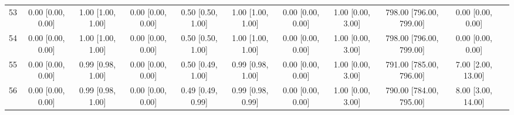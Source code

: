 \documentclass[8pt]{article}
\begin{document}
\begin{center}
\begin{footnotesize}
\begin{longtable}{|ccccccccccc|}
 53 &  0.00 [0.00, 0.00] &  1.00 [1.00, 1.00] &  0.00 [0.00, 0.00] &  0.50 [0.50, 1.00] &  1.00 [1.00, 1.00] &  0.00 [0.00, 0.00] &  1.00 [0.00, 3.00] &  798.00 [796.00, 799.00] &       0.00 [0.00, 0.00] \\
 54 &  0.00 [0.00, 0.00] &  1.00 [1.00, 1.00] &  0.00 [0.00, 0.00] &  0.50 [0.50, 1.00] &  1.00 [1.00, 1.00] &  0.00 [0.00, 0.00] &  1.00 [0.00, 3.00] &  798.00 [796.00, 799.00] &       0.00 [0.00, 0.00] \\
 55 &  0.00 [0.00, 0.00] &  0.99 [0.98, 1.00] &  0.00 [0.00, 0.00] &  0.50 [0.49, 1.00] &  0.99 [0.98, 1.00] &  0.00 [0.00, 0.00] &  1.00 [0.00, 3.00] &  791.00 [785.00, 796.00] &      7.00 [2.00, 13.00] \\
 56 &  0.00 [0.00, 0.00] &  0.99 [0.98, 1.00] &  0.00 [0.00, 0.00] &  0.49 [0.49, 0.99] &  0.99 [0.98, 0.99] &  0.00 [0.00, 0.00] &  1.00 [0.00, 3.00] &  790.00 [784.00, 795.00] &      8.00 [3.00, 14.00] \\
\end{longtable}
\end{footnotesize}
\end{center}
\end{document}
